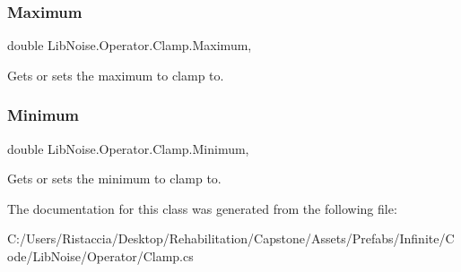 \subsubsection{\texorpdfstring{Maximum}{Maximum}}
{\footnotesize\ttfamily double Lib\+Noise.\+Operator.\+Clamp.\+Maximum\hspace{0.3cm}{\ttfamily [get]}, {\ttfamily [set]}}



Gets or sets the maximum to clamp to. 

\mbox{\label{class_lib_noise_1_1_operator_1_1_clamp_a024bbf117ceaa0021e3c764c03998999}} 
\subsubsection{\texorpdfstring{Minimum}{Minimum}}
{\footnotesize\ttfamily double Lib\+Noise.\+Operator.\+Clamp.\+Minimum\hspace{0.3cm}{\ttfamily [get]}, {\ttfamily [set]}}



Gets or sets the minimum to clamp to. 



The documentation for this class was generated from the following file\+:\begin{DoxyCompactItemize}
\item 
C\+:/\+Users/\+Ristaccia/\+Desktop/\+Rehabilitation/\+Capstone/\+Assets/\+Prefabs/\+Infinite/\+Code/\+Lib\+Noise/\+Operator/Clamp.\+cs\end{DoxyCompactItemize}
